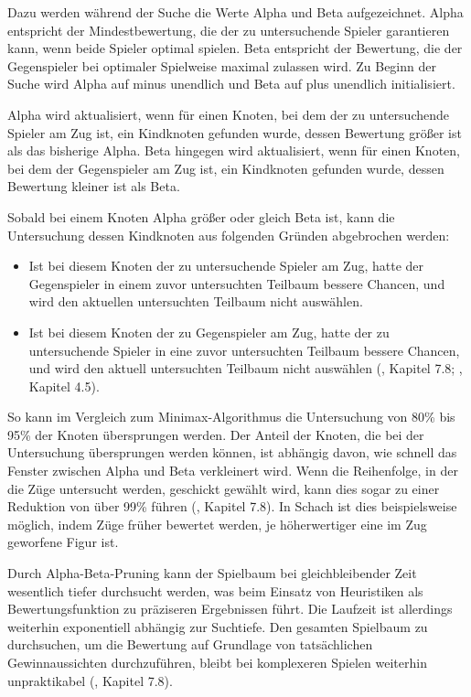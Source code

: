 Dazu werden während der Suche die Werte Alpha und Beta aufgezeichnet. Alpha entspricht der Mindestbewertung, die der zu untersuchende Spieler garantieren kann, wenn beide Spieler optimal spielen. Beta entspricht der Bewertung, die der Gegenspieler bei optimaler Spielweise maximal zulassen wird. Zu Beginn der Suche wird Alpha auf minus unendlich und Beta auf plus unendlich initialisiert.

Alpha wird aktualisiert, wenn für einen Knoten, bei dem der zu untersuchende Spieler am Zug ist, ein Kindknoten gefunden wurde, dessen Bewertung größer ist als das bisherige Alpha. Beta hingegen wird aktualisiert, wenn für einen Knoten, bei dem der Gegenspieler am Zug ist, ein Kindknoten gefunden wurde, dessen Bewertung kleiner ist als Beta.

Sobald bei einem Knoten Alpha größer oder gleich Beta ist, kann die Untersuchung dessen Kindknoten aus folgenden Gründen abgebrochen werden:

\begin{itemize}
	\item Ist bei diesem Knoten der zu untersuchende Spieler am Zug, hatte der Gegenspieler in einem zuvor untersuchten Teilbaum bessere Chancen, und wird den aktuellen untersuchten Teilbaum nicht auswählen.
	\item Ist bei diesem Knoten der zu Gegenspieler am Zug, hatte der zu untersuchende Spieler in eine zuvor untersuchten Teilbaum bessere Chancen, und wird den aktuell untersuchten Teilbaum nicht auswählen (\cite{Heineman.October2008}, Kapitel 7.8; \cite{Ferguson.January2019}, Kapitel 4.5).
\end{itemize}

So kann im Vergleich zum Minimax-Algorithmus die Untersuchung von 80\% bis 95\% der Knoten übersprungen werden. Der Anteil der Knoten, die bei der Untersuchung übersprungen werden können, ist abhängig davon, wie schnell das Fenster zwischen Alpha und Beta verkleinert wird. Wenn die Reihenfolge, in der die Züge untersucht werden, geschickt gewählt wird, kann dies sogar zu einer Reduktion von über 99\% führen (\cite{Heineman.October2008}, Kapitel 7.8). In Schach ist dies beispielsweise möglich, indem Züge früher bewertet werden, je höherwertiger eine im Zug geworfene Figur ist.

Durch Alpha-Beta-Pruning kann der Spielbaum bei gleichbleibender Zeit wesentlich tiefer durchsucht werden, was beim Einsatz von Heuristiken als Bewertungsfunktion zu präziseren Ergebnissen führt. Die Laufzeit ist allerdings weiterhin exponentiell abhängig zur Suchtiefe. Den gesamten Spielbaum zu durchsuchen, um die Bewertung auf Grundlage von tatsächlichen Gewinnaussichten durchzuführen, bleibt bei komplexeren Spielen weiterhin unpraktikabel (\cite{Heineman.October2008}, Kapitel 7.8).

